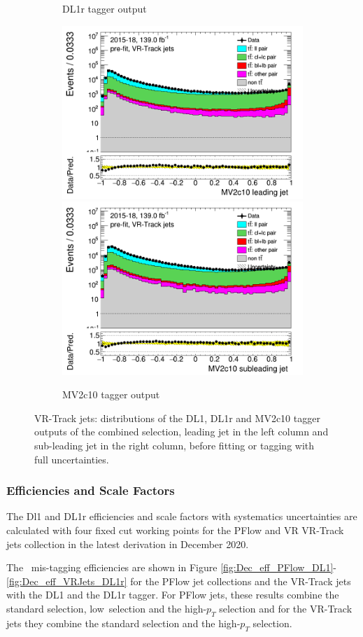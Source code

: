 \documentclass[letterpaper,12pt]{article}
\begin{document}
\begin{figure}[H]
\begin{subfigure}[t]{1\linewidth}
	\caption{DL1r tagger output}
	\end{subfigure}
	\begin{subfigure}[t]{1\linewidth}
	\includegraphics[width=.45\textwidth]{FTAG_plots/pretagNoRwwithhighpTVRJetsall/DataMC_h_J0_MV2c10_Fulltrackjet_log.png}
	\includegraphics[width=.45\textwidth]{FTAG_plots/pretagNoRwwithhighpTVRJetsall/DataMC_h_J1_MV2c10_Fulltrackjet_log.png}\\
	\caption{MV2c10 tagger output}
	\end{subfigure}
	\caption{VR-Track jets: distributions of the DL1, DL1r and MV2c10 tagger outputs of 
	the combined selection, 
	leading jet in the left column and sub-leading jet in the right column,
	before fitting or tagging with full uncertainties.} \label{fig:taggers_VRJets}
\end{figure}	

\subsubsection{Efficiencies and Scale Factors}

The Dl1 and DL1r \cjet efficiencies and scale factors with systematics 
uncertainties are calculated with four fixed cut working points 
for the PFlow and VR VR-Track jets collection in the latest derivation 
in December 2020.

The \cjet\ mis-tagging efficiencies are shown in Figure \ref{fig:Dec_eff_PFlow_DL1}-\ref{fig:Dec_eff_VRJets_DL1r} 
for the PFlow jet collections and the VR-Track jets with the DL1 and the DL1r tagger. 
For PFlow jets, these results combine the standard selection, low\pt\ selection and the high-$p_T$ selection 
and for the VR-Track jets they combine the standard selection and the high-$p_T$ selection. 
\end{document}
